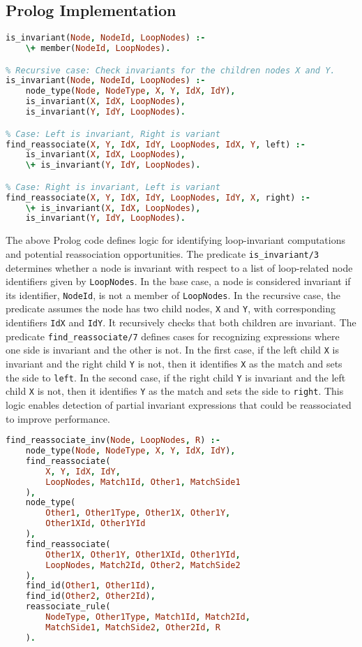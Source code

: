 \subsection*{Prolog Implementation}
\begin{lstlisting}[language=Prolog]
% Base case: NodeId should not be in LoopNodes.
is_invariant(Node, NodeId, LoopNodes) :-
    \+ member(NodeId, LoopNodes).

% Recursive case: Check invariants for the children nodes X and Y.
is_invariant(Node, NodeId, LoopNodes) :-
    node_type(Node, NodeType, X, Y, IdX, IdY),
    is_invariant(X, IdX, LoopNodes),
    is_invariant(Y, IdY, LoopNodes).

% Case: Left is invariant, Right is variant
find_reassociate(X, Y, IdX, IdY, LoopNodes, IdX, Y, left) :-
    is_invariant(X, IdX, LoopNodes),
    \+ is_invariant(Y, IdY, LoopNodes).

% Case: Right is invariant, Left is variant
find_reassociate(X, Y, IdX, IdY, LoopNodes, IdY, X, right) :-
    \+ is_invariant(X, IdX, LoopNodes),
    is_invariant(Y, IdY, LoopNodes).
\end{lstlisting}

The above Prolog code defines logic for identifying loop-invariant computations and potential reassociation opportunities. The predicate \texttt{is\_invariant/3} determines whether a node is invariant with respect to a list of loop-related node identifiers given by \texttt{LoopNodes}. In the base case, a node is considered invariant if its identifier, \texttt{NodeId}, is not a member of \texttt{LoopNodes}. In the recursive case, the predicate assumes the node has two child nodes, \texttt{X} and \texttt{Y}, with corresponding identifiers \texttt{IdX} and \texttt{IdY}. It recursively checks that both children are invariant. The predicate \texttt{find\_reassociate/7} defines cases for recognizing expressions where one side is invariant and the other is not. In the first case, if the left child \texttt{X} is invariant and the right child \texttt{Y} is not, then it identifies \texttt{X} as the match and sets the side to \texttt{left}. In the second case, if the right child \texttt{Y} is invariant and the left child \texttt{X} is not, then it identifies \texttt{Y} as the match and sets the side to \texttt{right}. 
This logic enables detection of partial invariant expressions that could be reassociated to improve performance.

\begin{lstlisting}[language=Prolog]
% Entry point for invariant reassociation   
find_reassociate_inv(Node, LoopNodes, R) :-
    node_type(Node, NodeType, X, Y, IdX, IdY),
    find_reassociate(
        X, Y, IdX, IdY, 
        LoopNodes, Match1Id, Other1, MatchSide1
    ),
    node_type(
        Other1, Other1Type, Other1X, Other1Y, 
        Other1XId, Other1YId
    ),
    find_reassociate(
        Other1X, Other1Y, Other1XId, Other1YId, 
        LoopNodes, Match2Id, Other2, MatchSide2
    ),
    find_id(Other1, Other1Id),
    find_id(Other2, Other2Id),
    reassociate_rule(
        NodeType, Other1Type, Match1Id, Match2Id, 
        MatchSide1, MatchSide2, Other2Id, R
    ).
\end{lstlisting}

